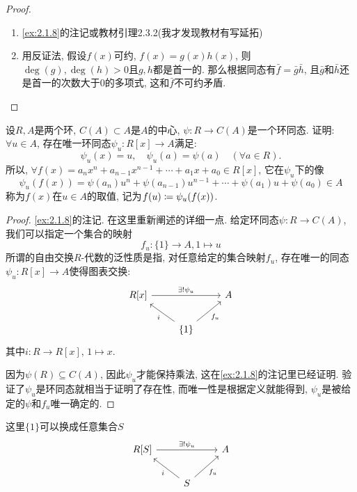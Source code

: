 \begin{proof}
    \begin{enumerate}[(1)]
        \item \ref{ex:2.1.8}的注记或教材引理2.3.2(我才发现教材有写延拓)
        \item 用反证法, 假设$f(x)$可约, $f(x) = g(x)h(x)$, 则$\deg(g), \deg(h) > 0$且$g, h$都是首一的. 那么根据同态有$\bar{f} = \bar{g}\bar{h}$, 且$\bar{g}$和$\bar{h}$还是首一的次数大于$0$的多项式, 这和$\bar{f}$不可约矛盾.
    \end{enumerate}
\end{proof}

\begin{problem}\label{ex:2.3.7}
    设$R, A$是两个环, $C(A) \subset A$是$A$的中心, $\psi:R \to C(A)$是一个环同态. 证明: $\forall u \in A$, 存在唯一环同态$\psi_u:R[x] \to A$满足: 
\[
    \psi_u(x) = u,\quad \psi_u(a) = \psi(a) \quad (\forall a \in R).
\]
所以, $\forall f(x) = a_nx^n + a_{n - 1}x^{n - 1} + \cdots + a_1x + a_0 \in R[x]$,
它在$\psi_u$下的像
\[
    \psi_u(f(x)) = \psi(a_n)u^n + \psi(a_{n - 1})u^{n - 1} + \cdots + \psi(a_1)u + \psi(a_0) \in A
\]
称为$f(x)$在$u \in A$的取值, 记为$f(u) \mathrel{\coloneqq} \psi_u(f(x))$.
\end{problem}

\begin{proof}
    \ref{ex:2.1.8}的注记. 在这里重新阐述的详细一点. 给定环同态$\psi:R \to C(A)$, 我们可以指定一个集合的映射
    \[
        f_u:\{1\} \to A, 1 \mapsto u
    \]
    所谓的自由交换$R$-代数的泛性质是指, 对任意给定的集合映射$f_u$, 存在唯一的同态$\psi_u:R[x] \to A$使得图表交换:
    \[
        \begin{tikzcd}
            {R[x]} \arrow[rr, "\exists!\psi_u"] &                                          & A \\
                                                & \{1\} \arrow[lu, "i"] \arrow[ru, "f_u"'] &  
        \end{tikzcd}
    \]
    其中$i:R \to R[x],\, 1 \mapsto x$.

    因为$\psi(R) \subseteq C(A)$, 因此$\psi_u$才能保持乘法, 这在\ref{ex:2.1.8}的注记里已经证明. 验证了$\psi_u$是环同态就相当于证明了存在性, 而唯一性是根据定义就能得到, $\psi_u$是被给定的$\psi$和$f_u$唯一确定的.
\end{proof}

\begin{remark}
    这里$\{1\}$可以换成任意集合$S$
\[
    \begin{tikzcd}
        {R[S]} \arrow[rr, "\exists!\psi_u"] &                                      & A \\
                                            & S \arrow[lu, "i"] \arrow[ru, "f_u"'] &  
        \end{tikzcd}
\]
\end{remark}

